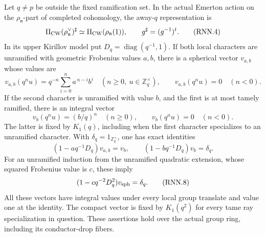 \begin{lemma}
\label{AC-K33-ray-refinement}
Let \(q\ne p\) be outside the fixed ramification set.
In the actual Emerton action on the \(\rho_{\mathfrak n}\)-part
of completed cohomology, the away-\(q\) representation is
\[
 \Pi_{\rm CW}(\rho_{\mathfrak n}^{\vee})^\sharp
       \simeq \Pi_{\rm CW}(\rho_{\mathfrak n}(1)),
 \qquad g^\sharp=(g^{-1})^t .
 \tag{RNN.4}
\]
In its upper Kirillov model put
\(D_q=\operatorname{diag}(q^{-1},1)\).
If both local characters are unramified with geometric Frobenius
values \(a,b\), there is a spherical vector \(v_{a,b}\) whose values
are
\[
 v_{a,b}(q^n u)=q^{-n}\sum_{i=0}^n a^{\,n-i}b^i
 \quad(n\geq0,\ u\in\mathbb Z_q^\times),
 \qquad v_{a,b}(q^n u)=0\quad(n<0).
 \tag{RNN.5}
\]
If the second character is unramified with value \(b\), and the
first is at most tamely ramified, there is an integral vector
\[
 v_b(q^n u)=(b/q)^n\quad(n\geq0),\qquad
 v_b(q^n u)=0\quad(n<0).
 \tag{RNN.6}
\]
The latter is fixed by \(K_1(q)\), including when the first
character specializes to an unramified character.  With
\(\delta_q=1_{\mathbb Z_q^\times}\), one has exact identities
\[
 (1-aq^{-1}D_q)v_{a,b}=v_b,\qquad
 (1-bq^{-1}D_q)v_b=\delta_q.
 \tag{RNN.7}
\]
For an unramified induction from the unramified quadratic extension,
whose squared Frobenius value is \(c\), these imply
\[
 (1-cq^{-2}D_q^2)v_{\rm sph}=\delta_q.
 \tag{RNN.8}
\]
All these vectors have integral values under every local group
translate and value one at the identity.  The compact vector is
fixed by \(K_1(q^2)\) for every tame ray specialization in question.
These assertions hold over the actual group ring, including its
conductor-drop fibers.
\end{lemma}
